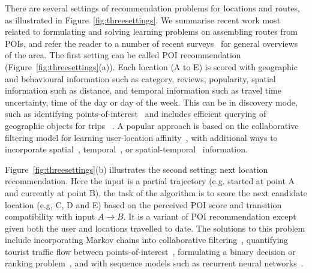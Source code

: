 

There are several settings of recommendation problems for locations and routes, as illustrated in Figure~\ref{fig:threesettings}.
We summarise recent work most related to formulating and solving learning problems on assembling routes from POIs,
and refer the reader to a number of recent surveys~\cite{bao2015recommendations,zheng2015trajectory,zheng2014urban} for general overviews of the area.
The first setting can be called POI recommendation (Figure~\ref{fig:threesettings}(a)). Each location (A to E) is scored with geographic and behavioural information such as category, reviews, popularity, spatial information such as distance, and temporal information such as travel time uncertainty, time of the day or day of the week.
This can be in discovery mode, such as identifying points-of-interest~\cite{zheng2009mining,li2015instagram} and includes efficient querying of geographic objects for trips ~\cite{hashem2015efficient}.
A popular approach is based on the collaborative filtering model
for learning user-location affinity~\cite{shi2011personalized}, with additional ways to incorporate spatial~\cite{lian2014geomf,liu2014exploiting}, temporal~\cite{yuan2013timeaware,hsieh2014mining,gao2013temporal}, or spatial-temporal~\cite{yuan2014graph} information.

Figure~\ref{fig:threesettings}(b) illustrates the second setting: next location recommendation.
Here the input is a partial trajectory (e.g. started at point A and currently at point B), the task of the algorithm is to score the next candidate location (e.g, C, D and E) based on the perceived POI score and transition compatibility with input $A\rightarrow B$.
It is a variant of POI recommendation except given both the user and locations travelled to date. The solutions to this problem include incorporating Markov chains into collaborative filtering~\cite{fpmc10,ijcai13,zhang2015location},
quantifying tourist traffic flow between points-of-interest~\cite{zheng2012patterns},
formulating a binary decision or ranking problem~\cite{baraglia2013learnext}, and with sequence models such as recurrent neural networks~\cite{aaai16}.


